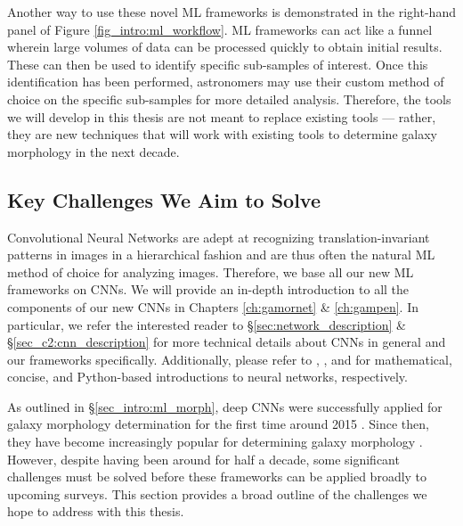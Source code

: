 Another way to use these novel ML frameworks is demonstrated in the right-hand panel of Figure \ref{fig_intro:ml_workflow}. ML frameworks can act like a funnel wherein large volumes of data can be processed quickly to obtain initial results. These can then be used to identify specific sub-samples of interest. Once this identification has been performed, astronomers may use their custom method of choice on the specific sub-samples for more detailed analysis. Therefore, the tools we will develop in this thesis are not meant to replace existing tools --- rather, they are new techniques that will work with existing tools to determine galaxy morphology in the next decade. 


\subsection{Key Challenges We Aim to Solve} \label{sec_intro:challenges}

Convolutional Neural Networks are adept at recognizing translation-invariant patterns in images in a hierarchical fashion and are thus often the natural ML method of choice for analyzing images. Therefore, we base all our new ML frameworks on CNNs. We will provide an in-depth introduction to all the components of our new CNNs in Chapters \ref{ch:gamornet} \& \ref{ch:gampen}. In particular, we refer the interested reader to \S \ref{sec:network_description} \& \S\ref{sec_c2:cnn_description} for more technical details about CNNs in general and our frameworks specifically. Additionally, please refer to \citet{mckay_03}, \citet{nielsen}, and \citet{chollet_21} for mathematical, concise, and Python-based introductions to neural networks, respectively.

As outlined in \S \ref{sec_intro:ml_morph}, deep CNNs were successfully applied for galaxy morphology determination for the first time around 2015 \citep{Dieleman2015Rotation-invariantPrediction, Huertas-Company2015ALEARNING}. Since then, they have become increasingly popular for determining galaxy morphology \citep[e.g.,][]{Tuccillo2018DeepFitting, Hausen2020MorpheusData, Walmsley2020GalaxyLearning, Cheng2021GalaxyNetworks, Vega-Ferrero2021PushingSurvey, Tarsitano2022ImageLearning}. However, despite having been around for half a decade, some significant challenges must be solved before these frameworks can be applied broadly to upcoming surveys. This section provides a broad outline of the challenges we hope to address with this thesis. 

